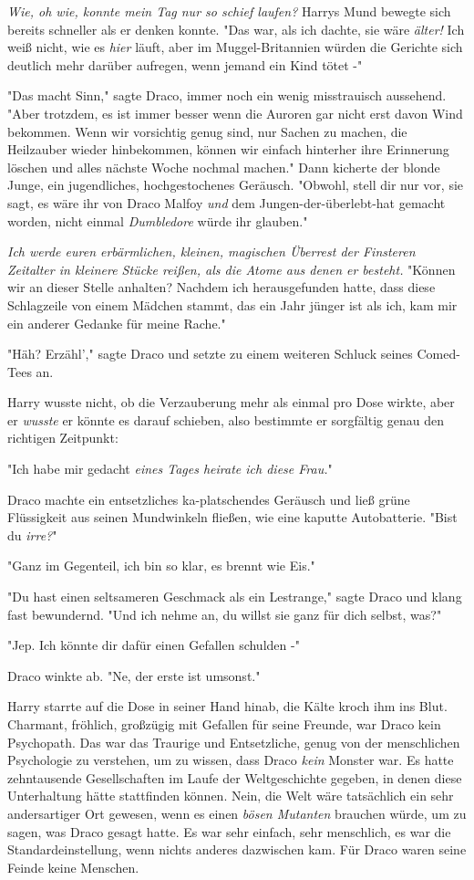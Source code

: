 {\emph{Wie, oh wie, konnte mein Tag nur so schief laufen?} Harrys Mund bewegte sich bereits schneller als er denken konnte. "Das war, als ich dachte, sie wäre \emph{älter!} Ich weiß nicht, wie es \emph{hier} läuft, aber im Muggel-Britannien würden die Gerichte sich deutlich mehr darüber aufregen, wenn jemand ein Kind tötet -"

"Das macht Sinn," sagte Draco, immer noch ein wenig misstrauisch aussehend. "Aber trotzdem, es ist immer besser wenn die Auroren gar nicht erst davon Wind bekommen. Wenn wir vorsichtig genug sind, nur Sachen zu machen, die Heilzauber wieder hinbekommen, können wir einfach hinterher ihre Erinnerung löschen und alles nächste Woche nochmal machen." Dann kicherte der blonde Junge, ein jugendliches, hochgestochenes Geräusch. "Obwohl, stell dir nur vor, sie sagt, es wäre ihr von Draco Malfoy \emph{und} dem Jungen-der-überlebt-hat gemacht worden, nicht einmal \emph{Dumbledore} würde ihr glauben."

\emph{Ich werde euren erbärmlichen, kleinen, magischen Überrest der Finsteren Zeitalter in kleinere Stücke reißen, als die Atome aus denen er besteht.} "Können wir an dieser Stelle anhalten? Nachdem ich herausgefunden hatte, dass diese Schlagzeile von einem Mädchen stammt, das ein Jahr jünger ist als ich, kam mir ein anderer Gedanke für meine Rache."

"Häh? Erzähl'," sagte Draco und setzte zu einem weiteren Schluck seines Comed-Tees an.

Harry wusste nicht, ob die Verzauberung mehr als einmal pro Dose wirkte, aber er \emph{wusste} er könnte es darauf schieben, also bestimmte er sorgfältig genau den richtigen Zeitpunkt:

"Ich habe mir gedacht \emph{eines Tages heirate ich diese Frau.}"

Draco machte ein entsetzliches ka-platschendes Geräusch und ließ grüne Flüssigkeit aus seinen Mundwinkeln fließen, wie eine kaputte Autobatterie. "Bist du \emph{irre?}"

"Ganz im Gegenteil, ich bin so klar, es brennt wie Eis."

"Du hast einen seltsameren Geschmack als ein Lestrange," sagte Draco und klang fast bewundernd. "Und ich nehme an, du willst sie ganz für dich selbst, was?"

"Jep. Ich könnte dir dafür einen Gefallen schulden -"

Draco winkte ab. "Ne, der erste ist umsonst."

Harry starrte auf die Dose in seiner Hand hinab, die Kälte kroch ihm ins Blut. Charmant, fröhlich, großzügig mit Gefallen für seine Freunde, war Draco kein Psychopath. Das war das Traurige und Entsetzliche, genug von der menschlichen Psychologie zu verstehen, um zu wissen, dass Draco \emph{kein} Monster war. Es hatte zehntausende Gesellschaften im Laufe der Weltgeschichte gegeben, in denen diese Unterhaltung hätte stattfinden können. Nein, die Welt wäre tatsächlich ein sehr andersartiger Ort gewesen, wenn es einen \emph{bösen Mutanten} brauchen würde, um zu sagen, was Draco gesagt hatte. Es war sehr einfach, sehr menschlich, es war die Standardeinstellung, wenn nichts anderes dazwischen kam. Für Draco waren seine Feinde keine Menschen.

}
